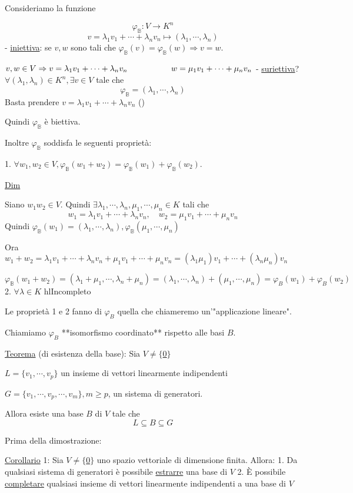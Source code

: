 \documentclass{article}
\begin{document}
Consideriamo la funzione

$$\varphi_\mathbb{B}:V\rightarrow K^n$$
$$v=\lambda_1v_1+\cdots+\lambda_nv_n\mapsto(\lambda_1,\cdots,\lambda_n)$$
- \ul{iniettiva}: se $v,w$ sono tali che $\varphi_\mathbb{B}(v)=\varphi_\mathbb{B}(w)\Rightarrow v=w$.

    $v,w\in V\Rightarrow v=\lambda_1v_1+\cdots+\lambda_nv_n\\\qquad\qquad\quad\ w=\mu_1v_1+\cdots+\mu_nv_n$
- \ul{suriettiva}? $\forall(\lambda_1,\lambda_n)\in K^n,\exists v\in V$ tale che
$$\varphi_\mathbb{B}=(\lambda_1,\cdots,\lambda_n)$$
Basta prendere $v=\lambda_1v_1+\cdots+\lambda_nv_n$ (\boxed)

Quindi $\varphi_\mathbb{B}$ è biettiva.

Inoltre $\varphi_\mathbb{B}$ soddisfa le seguenti proprietà:

1. $\forall w_1,w_2\in V,\varphi_\mathbb{B}(w_1+w_2)=\varphi_\mathbb{B}(w_1)+\varphi_\mathbb{B}(w_2)$.

\ul{Dim}

Siano $w_1w_2\in V$. Quindi $\exists\lambda_1,\cdots,\lambda_n,\mu_1,\cdots,\mu_n\in K$ tali che
$$w_1=\lambda_1v_1+\cdots+\lambda_nv_n,\quad w_2=\mu_1v_1+\cdots+\mu_nv_n$$
Quindi $\varphi_\mathbb{B}(w_1)=(\lambda_1,\cdots,\lambda_n),\varphi_\mathbb{B}(\mu_1,\cdots,\mu_n)$

Ora $w_1+w_2=\lambda_1v_1+\cdots+\lambda_nv_n+\mu_1v_1+\cdots+\mu_nv_n=(\lambda_1\mu_1)v_1+\cdots+(\lambda_n\mu_n)v_n$

$\varphi_\mathbb{B}(w_1+w_2)=(\lambda_1+\mu_1,\cdots,\lambda_n+\mu_n)=(\lambda_1,\cdots,\lambda_n)+(\mu_1,\cdots,\mu_n)=\varphi_B(w_1)+\varphi_B(w_2)$
2. $\forall\lambda\in K$ hl{Incompleto}

Le proprietà 1 e 2 fanno di $\varphi_B$ quella che chiameremo un'"applicazione lineare".

Chiamiamo $\varphi_B$ **isomorfismo coordinato** rispetto alle basi $B$.

\ul{Teorema} (di esistenza della base): Sia $V\not=\{$\ul{0}$\}$

$L=\{v_1,\cdots,v_p\}$ un insieme di vettori linearmente indipendenti

$G=\{v_1,\cdots,v_p,\cdots,v_m\},m\ge p$, un sistema di generatori.

Allora esiste una base $B$ di $V$ tale che
$$L\subseteq B\subseteq G$$

Prima della dimostrazione:

\ul{Corollario} 1: Sia $V\not=\{$\ul{0}$\}$ uno spazio vettoriale di dimensione finita. Allora:
1. Da qualsiasi sistema di generatori è possibile \ul{estrarre} una base di $V$
2. È possibile \ul{completare} qualsiasi insieme di vettori linearmente indipendenti a una base di $V$
\end{document}
